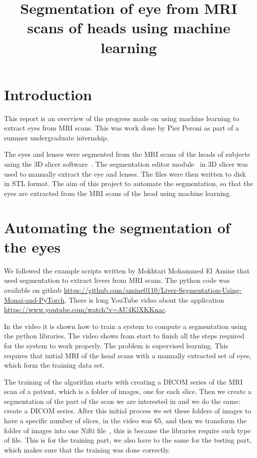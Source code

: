 \documentclass[12pt]{article}
\begin{document}
\title{Segmentation of eye from MRI scans of heads using machine learning}
\date{}



\maketitle


\section{Introduction}

This report is an overview of the progress made on using machine
  learning to extract eyes from MRI scans.
  This was work done by Pier Peroni as part of a summer undergraduate
  internship.

The eyes and lenses were segmented from the MRI scans of the heads
of subjects using the 3D slicer software~\cite{kikinis20133d}.  The
segmentation editor module~\cite{pinter2019polymorph} in 3D slicer was
used to manually extract the eye and lenses.  The files were then
written to disk in STL format. The aim of this project to automate the
segmentation, so that the eyes are extracted from the MRI scans
of the head using machine learning.

\section{Automating the segmentation of the eyes}

We followed the example scripts written by
Mokhtari Mohammed El Amine that used segmentation to extract
livers from MRI scans. The python code was available
on github
\url{https://github.com/amine0110/Liver-Segmentation-Using-Monai-and-PyTorch}. There
is long YouTube video about the application
\url{https://www.youtube.com/watch?v=AU4KlXKKnac}.


In the video it is shown how to train a system to compute a
segmentation using the python libraries. The video shows
from start to finish all the steps required for the system to work
properly. The problem is supervised learning. This requires that
initial MRI of the head scans with  a manually extracted set of eyes,
which form the training data set.


The training of the algorithm starts with creating a DICOM series of
the MRI scan of a patient, which is a folder of images, one for each
slice. Then we create a segmentation of the part of the scan we are
interested in and we do the same: create a DICOM series. After this
initial process we set these folders of images to have a specific
number of slices, in the video was 65, and then we transform the
folder of images into one Nifti file~\cite{li2016first},
this is because the libraries
require such type of file. This is for the training part, we also have
to the same for the testing part, which makes sure that the training
was done correctly.
\end{document}
